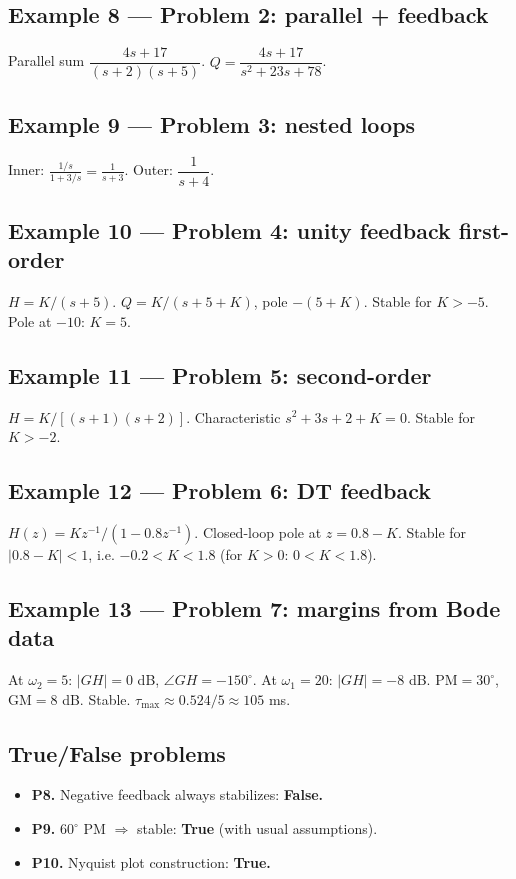 \documentclass[11pt]{article}
\begin{document}
\subsection{Example 8 --- Problem 2: parallel + feedback}
Parallel sum $\dfrac{4s+17}{(s+2)(s+5)}$. $Q=\dfrac{4s+17}{s^2+23s+78}$.

\subsection{Example 9 --- Problem 3: nested loops}
Inner: $\tfrac{1/s}{1+3/s}=\tfrac{1}{s+3}$. Outer: $\dfrac{1}{s+4}$.

\subsection{Example 10 --- Problem 4: unity feedback first-order}
$H=K/(s+5)$. $Q=K/(s+5+K)$, pole $-(5+K)$. Stable for $K>-5$. Pole at $-10$: $K=5$.

\subsection{Example 11 --- Problem 5: second-order}
$H=K/[(s+1)(s+2)]$. Characteristic $s^2+3s+2+K=0$. Stable for $K>-2$.

\subsection{Example 12 --- Problem 6: DT feedback}
$H(z)=Kz^{-1}/(1-0.8 z^{-1})$. Closed-loop pole at $z=0.8-K$. Stable for $|0.8-K|<1$, i.e. $-0.2<K<1.8$ (for $K>0$: $0<K<1.8$).

\subsection{Example 13 --- Problem 7: margins from Bode data}
At $\omega_2=5$: $|GH|=0$ dB, $\angle GH=-150^\circ$. At $\omega_1=20$: $|GH|=-8$ dB.
$\mathrm{PM}=30^\circ$, $\mathrm{GM}=8$ dB. Stable. $\tau_\max\approx 0.524/5\approx 105$ ms.

\subsection{True/False problems}
\begin{itemize}
\item \textbf{P8.} Negative feedback always stabilizes: \textbf{False.}
\item \textbf{P9.} $60^\circ$ PM $\Rightarrow$ stable: \textbf{True} (with usual assumptions).
\item \textbf{P10.} Nyquist plot construction: \textbf{True.}
\end{itemize}
\end{document}
